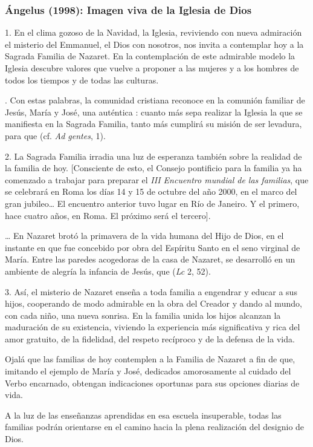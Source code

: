			\subsubsection{Ángelus (1998): Imagen viva de la Iglesia de Dios}
			
				
				\begin{body}
					1. En el clima gozoso de la Navidad, la Iglesia, reviviendo con nueva admiración el misterio del Emmanuel, el Dios con nosotros, nos invita a contemplar hoy a la Sagrada Familia de Nazaret. En la contemplación de este admirable modelo la Iglesia descubre valores que vuelve a proponer a las mujeres y a los hombres de todos los tiempos y de todas las culturas.

					. Con estas palabras, la comunidad cristiana reconoce en la comunión familiar de Jesús, María y José, una auténtica : cuanto más sepa realizar la Iglesia la  que se manifiesta en la Sagrada Familia, tanto más cumplirá su misión de ser levadura, para que  (cf. \emph{Ad gentes}, 1).
					
					2. La Sagrada Familia irradia una luz de esperanza también sobre la realidad de la familia de hoy. {[}Consciente de esto, el Consejo pontificio para la familia ya ha comenzado a trabajar para preparar el \emph{III Encuentro mundial de las familias}, que se celebrará en Roma los días 14 y 15 de octubre del año 2000, en el marco del gran jubileo\ldots{} El encuentro anterior tuvo lugar en Río de Janeiro. Y el primero, hace cuatro años, en Roma. El próximo será el tercero{]}.
					
					\ldots{} En Nazaret brotó la primavera de la vida humana del Hijo de Dios, en el instante en que fue concebido por obra del Espíritu Santo en el seno virginal de María. Entre las paredes acogedoras de la casa de Nazaret, se desarrolló en un ambiente de alegría la infancia de Jesús, que  (\emph{Lc} 2, 52).
					
					3. Así, el misterio de Nazaret enseña a toda familia a engendrar y educar a sus hijos, cooperando de modo admirable en la obra del Creador y dando al mundo, con cada niño, una nueva sonrisa. En la familia unida los hijos alcanzan la maduración de su existencia, viviendo la experiencia más significativa y rica del amor gratuito, de la fidelidad, del respeto recíproco y de la defensa de la vida.
					
					Ojalá que las familias de hoy contemplen a la Familia de Nazaret a fin de que, imitando el ejemplo de María y José, dedicados amorosamente al cuidado del Verbo encarnado, obtengan indicaciones oportunas para sus opciones diarias de vida.
					
					A la luz de las enseñanzas aprendidas en esa escuela insuperable, todas las familias podrán orientarse en el camino hacia la plena realización del designio de Dios.
				\end{body}
			
